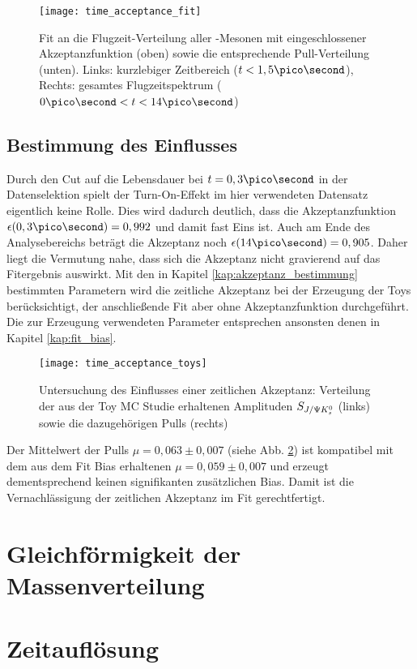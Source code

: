 \begin{figure}[hptb]
\centering
\texttt{[image: time\_acceptance\_fit]}
\caption{Fit an die Flugzeit-Verteilung aller \Bd-Mesonen mit eingeschlossener Akzeptanzfunktion (oben) sowie die entsprechende Pull-Verteilung (unten). Links: kurzlebiger Zeitbereich ($t<1,5\pico\second$), Rechts: gesamtes Flugzeitspektrum ($0\ps < t < 14\ps$)}
\label{fig:fit_akzeptanz}
\end{figure}

\subsection{Bestimmung des Einflusses}
Durch den Cut auf die Lebensdauer bei $t = 0,3\ps$ in der Datenselektion spielt der Turn-On-Effekt im hier verwendeten Datensatz eigentlich keine Rolle. Dies wird dadurch deutlich, dass die Akzeptanzfunktion $\epsilon(0,3\ps) = 0,992$ und damit fast Eins ist. Auch am Ende des Analysebereichs beträgt die Akzeptanz noch $\epsilon(14\ps) = 0,905$. Daher liegt die Vermutung nahe, dass sich die Akzeptanz nicht gravierend auf das Fitergebnis auswirkt. Mit den in Kapitel \ref{kap:akzeptanz_bestimmung} bestimmten Parametern wird die zeitliche Akzeptanz bei der Erzeugung der Toys berücksichtigt, der anschließende Fit aber ohne Akzeptanzfunktion durchgeführt. Die zur Erzeugung verwendeten Parameter entsprechen ansonsten denen in Kapitel \ref{kap:fit_bias}.

\begin{figure}[hptb]
\centering
\texttt{[image: time\_acceptance\_toys]}
\caption{Untersuchung des Einflusses einer zeitlichen Akzeptanz: Verteilung der aus der Toy MC Studie erhaltenen Amplituden $S_{J/\Psi K_s^0}$ (links) sowie die dazugehörigen Pulls (rechts)}
\label{fig:toys_acceptance}
\end{figure}

Der Mittelwert der Pulls $\mu = 0,063 \pm 0,007$ (siehe Abb. \ref{fig:toys_acceptance}) ist kompatibel mit dem aus dem Fit Bias erhaltenen $\mu = 0,059 \pm 0,007$ und erzeugt dementsprechend keinen signifikanten zusätzlichen Bias. Damit ist die Vernachlässigung der zeitlichen Akzeptanz im Fit gerechtfertigt.



\section{Gleichförmigkeit der Massenverteilung}

\section{Zeitauflösung}
